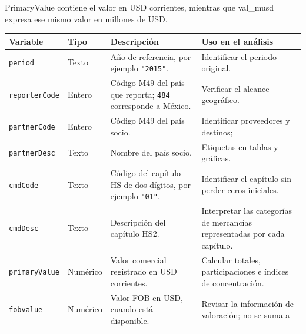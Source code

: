 \documentclass[
]{article}
\newcounter{none} %
\begin{document}
PrimaryValue contiene el valor en USD corrientes, mientras que val\_musd
expresa ese mismo valor en millones de USD.

{\def\LTcaptype{none} %
\begin{longtable}[]{@{}
  >{\raggedright\arraybackslash}p{}
  >{\raggedright\arraybackslash}p{}
  >{\raggedright\arraybackslash}p{}
  >{\raggedright\arraybackslash}p{}@{}}
\toprule\noalign{}
\begin{minipage}[b]{\linewidth}\raggedright
Variable
\end{minipage} & \begin{minipage}[b]{\linewidth}\raggedright
Tipo
\end{minipage} & \begin{minipage}[b]{\linewidth}\raggedright
Descripción
\end{minipage} & \begin{minipage}[b]{\linewidth}\raggedright
Uso en el análisis
\end{minipage} \\
\midrule\noalign{}
\endhead
\bottomrule\noalign{}
\endlastfoot
\texttt{period} & Texto & Año de referencia, por ejemplo
\texttt{"2015"}. & Identificar el periodo original. \\
\texttt{reporterCode} & Entero & Código M49 del país que reporta;
\texttt{484} corresponde a México. & Verificar el alcance geográfico. \\
\texttt{partnerCode} & Entero & Código M49 del país socio. & Identificar
proveedores y destinos; \\
\texttt{partnerDesc} & Texto & Nombre del país socio. & Etiquetas en
tablas y gráficas. \\
\texttt{cmdCode} & Texto & Código del capítulo HS de dos dígitos, por
ejemplo \texttt{"01"}. & Identificar el capítulo sin perder ceros
iniciales. \\
\texttt{cmdDesc} & Texto & Descripción del capítulo HS2. & Interpretar
las categorías de mercancías representadas por cada capítulo. \\
\texttt{primaryValue} & Numérico & Valor comercial registrado en USD
corrientes. & Calcular totales, participaciones e índices de
concentración. \\
\texttt{fobvalue} & Numérico & Valor FOB en USD, cuando está disponible.
& Revisar la información de valoración; no se suma a

\end{longtable}}
\end{document}
